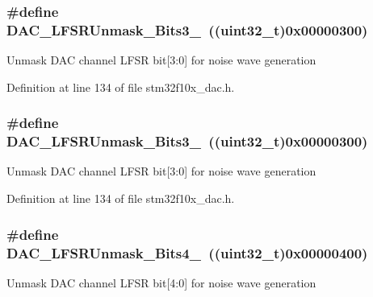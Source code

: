 \subsubsection[{\texorpdfstring{D\+A\+C\+\_\+\+L\+F\+S\+R\+Unmask\+\_\+\+Bits3\+\_\+0}{DAC_LFSRUnmask_Bits3_0}}]{\setlength{\rightskip}{0pt plus 5cm}\#define D\+A\+C\+\_\+\+L\+F\+S\+R\+Unmask\+\_\+\+Bits3\+\_~(({\bf uint32\+\_\+t})0x00000300)}\hypertarget{group___d_a_c__lfsrunmask__triangleamplitude_gafe219362b3a48d8678a65ef38cb45532}{}\label{group___d_a_c__lfsrunmask__triangleamplitude_gafe219362b3a48d8678a65ef38cb45532}
Unmask D\+AC channel L\+F\+SR bit\mbox{[}3\+:0\mbox{]} for noise wave generation 

Definition at line 134 of file stm32f10x\+\_\+dac.\+h.

\subsubsection[{\texorpdfstring{D\+A\+C\+\_\+\+L\+F\+S\+R\+Unmask\+\_\+\+Bits3\+\_\+0}{DAC_LFSRUnmask_Bits3_0}}]{\setlength{\rightskip}{0pt plus 5cm}\#define D\+A\+C\+\_\+\+L\+F\+S\+R\+Unmask\+\_\+\+Bits3\+\_~(({\bf uint32\+\_\+t})0x00000300)}\hypertarget{group___d_a_c__lfsrunmask__triangleamplitude_gafe219362b3a48d8678a65ef38cb45532}{}\label{group___d_a_c__lfsrunmask__triangleamplitude_gafe219362b3a48d8678a65ef38cb45532}
Unmask D\+AC channel L\+F\+SR bit\mbox{[}3\+:0\mbox{]} for noise wave generation 

Definition at line 134 of file stm32f10x\+\_\+dac.\+h.

\subsubsection[{\texorpdfstring{D\+A\+C\+\_\+\+L\+F\+S\+R\+Unmask\+\_\+\+Bits4\+\_\+0}{DAC_LFSRUnmask_Bits4_0}}]{\setlength{\rightskip}{0pt plus 5cm}\#define D\+A\+C\+\_\+\+L\+F\+S\+R\+Unmask\+\_\+\+Bits4\+\_~(({\bf uint32\+\_\+t})0x00000400)}\hypertarget{group___d_a_c__lfsrunmask__triangleamplitude_ga2543d802e19d592a26c8231be663cdac}{}\label{group___d_a_c__lfsrunmask__triangleamplitude_ga2543d802e19d592a26c8231be663cdac}
Unmask D\+AC channel L\+F\+SR bit\mbox{[}4\+:0\mbox{]} for noise wave generation 

